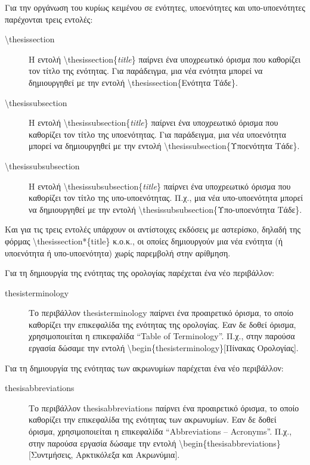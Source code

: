 \documentclass[english]{dithesis} %
\begin{document}
Για την οργάνωση του κυρίως κειμένου σε ενότητες, υποενότητες και
υπο-υποενότητες παρέχονται τρεις εντολές:
\begin{description}
\item[\textbackslash{thesissection}]
  Η εντολή \textbackslash{thesissection}\{\textit{title}\} παίρνει ένα
  υποχρεωτικό όρισμα που καθορίζει τον τίτλο της ενότητας.
  Για παράδειγμα, μια νέα ενότητα μπορεί να δημιουργηθεί με την εντολή
  \textbackslash{thesissection}\{Ενότητα Tάδε\}.
\item[\textbackslash{thesissubsection}]
  Η εντολή \textbackslash{thesissubsection}\{\textit{title}\} παίρνει ένα
  υποχρεωτικό όρισμα που καθορίζει τον τίτλο της υποενότητας.
  Για παράδειγμα, μια νέα υποενότητα μπορεί να δημιουργηθεί με την εντολή
  \textbackslash{thesissubsection}\{Υποενότητα Tάδε\}.
\item[\textbackslash{thesissubsubsection}]
  Η εντολή \textbackslash{thesissubsubsection}\{\textit{title}\} παίρνει ένα
  υποχρεωτικό όρισμα που καθορίζει τον τίτλο της υπο-υποενότητας.
  Π.χ., μια νέα υπο-υποενότητα μπορεί να δημιουργηθεί με την εντολή
  \textbackslash{thesissubsubsection}\{Υπο-υποενότητα Tάδε\}.
\end{description}

Και για τις τρεις εντολές υπάρχουν οι αντίστοιχες εκδόσεις με αστερίσκο,
δηλαδή της φόρμας \textbackslash{thesissection*}\{title\} κ.ο.κ., οι οποίες
δημιουργούν μια νέα ενότητα (ή υποενότητα ή υπο-υποενότητα) χωρίς παρεμβολή
στην αρίθμηση.


Για τη δημιουργία της ενότητας της ορολογίας παρέχεται ένα νέο περιβάλλον:
\begin{description}
\item[thesisterminology]
  Το περιβάλλον thesisterminology παίρνει ένα προαιρετικό όρισμα, το οποίο
  καθορίζει την επικεφαλίδα της ενότητας της ορολογίας.
  Εαν δε δοθεί όρισμα, χρησιμοποιείται η επικεφαλίδα ``Table of Terminology''.
  Π.χ., στην παρούσα εργασία δώσαμε την εντολή
  \textbackslash{begin}\{thesisterminology\}{[Πίνακας Ορολογίας]}.
\end{description}

Για τη δημιουργία της ενότητας των ακρωνυμίων παρέχεται ένα νέο περιβάλλον:
\begin{description}
\item[thesisabbreviations]
  Το περιβάλλον thesisabbreviations παίρνει ένα προαιρετικό όρισμα, το οποίο
  καθορίζει την επικεφαλίδα της ενότητας των ακρωνυμίων.
  Εαν δε δοθεί όρισμα, χρησιμοποιείται η επικεφαλίδα ``Abbreviations -- Acronyms''.
  Π.χ., στην παρούσα εργασία δώσαμε την εντολή
  \textbackslash{begin}\{thesisabbreviations\}{[Συντμήσεις, Αρκτικόλεξα και
  Ακρωνύμια]}.
\end{description}
\end{document}
